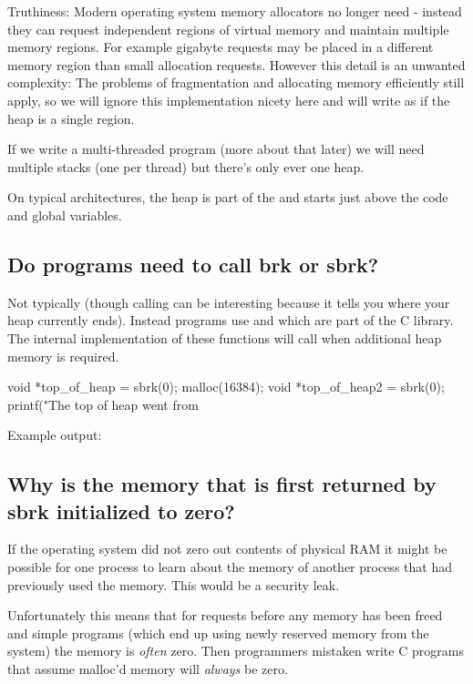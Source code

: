 Truthiness: Modern operating system memory allocators no longer need  - instead they can request independent regions of virtual memory and maintain multiple memory regions. For example gigabyte requests may be placed in a different memory region than small allocation requests. However this detail is an unwanted complexity: The problems of fragmentation and allocating memory efficiently still apply, so we will ignore this implementation nicety here and will write as if the heap is a single region.

If we write a multi-threaded program (more about that later) we will need multiple stacks (one per thread) but there's only ever one heap.

On typical architectures, the heap is part of the  and starts just above the code and global variables.

\subsection{Do programs need to call brk or sbrk?}

Not typically (though calling  can be interesting because it tells you where your heap currently ends). Instead programs use  and  which are part of the C library. The internal implementation of these functions will call  when additional heap memory is required.

\begin{code}[language=C]
void *top_of_heap = sbrk(0);
malloc(16384);
void *top_of_heap2 = sbrk(0);
printf("The top of heap went from %
\end{code}

Example output: 

\subsection{Why is the memory that is first returned by sbrk initialized to zero?}

If the operating system did not zero out contents of physical RAM it might be possible for one process to learn about the memory of another process that had previously used the memory. This would be a security leak.

Unfortunately this means that for  requests before any memory has been freed and simple programs (which end up using newly reserved memory from the system) the memory is \emph{often} zero. Then programmers mistaken write C programs that assume malloc'd memory will \emph{always} be zero.

